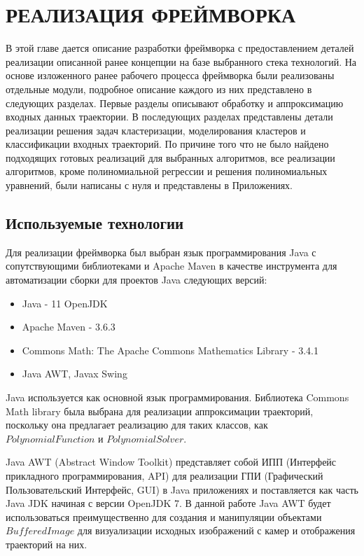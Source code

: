 \chapter{РЕАЛИЗАЦИЯ ФРЕЙМВОРКА}
\label{ch:РЕАЛИЗАЦИЯ ФРЕЙМВОРКА}

В этой главе дается описание разработки фреймворка с предоставлением деталей реализации описанной ранее концепции на базе выбранного стека технологий. На основе изложенного ранее рабочего процесса фреймворка были реализованы отдельные модули, подробное описание каждого из них представлено в следующих разделах. Первые разделы описывают обработку и аппроксимацию входных данных траектории. В последующих разделах представлены детали реализации решения задач кластеризации, моделирования кластеров и классификации входных траекторий. По причине того что не было найдено подходящих готовых реализаций для выбранных алгоритмов, все реализации алгоритмов, кроме полиномиальной регрессии и решения полиномиальных уравнений, были написаны с нуля и представлены в Приложениях.

\section{Используемые технологии}

Для реализации фреймворка был выбран язык программирования Java с сопутствующими библиотеками и Apache Maven в качестве инструмента для автоматизации сборки для проектов Java следующих версий:

\begin{itemize}
	\setlength\itemsep{-0.5em}
	\item Java - 11 OpenJDK
	\item Apache Maven - 3.6.3
	\item Commons Math: The Apache Commons Mathematics Library - 3.4.1
	\item Java AWT, Javax Swing 
\end{itemize}

Java используется как основной язык программирования. Библиотека Commons Math library была выбрана для реализации аппроксимации траекторий, поскольку она предлагает реализацию для таких классов, как $PolynomialFunction$ и $PolynomialSolver$. 

Java AWT (Abstract Window Toolkit) представляет собой ИПП (Интерфейс прикладного программирования, API) для реализации ГПИ (Графический Пользовательский Интерфейс, GUI) в Java приложениях и поставляется как часть Java JDK начиная с версии OpenJDK 7. В данной работе Java AWT будет использоваться преимущественно для создания и манипуляции объектами $BufferedImage$ для визуализации исходных изображений с камер и отображения траекторий на них.

